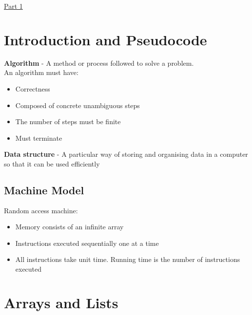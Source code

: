 \documentclass{article}[18pt]
\begin{document}
\begin{center}
\underline{\huge Part 1}
\end{center}
\section{Introduction and Pseudocode}
\textbf{Algorithm} - A method or process followed to solve a problem.\\
An algorithm must have:
\begin{itemize}
	\item Correctness
	\item Composed of concrete unambiguous steps
	\item The number of steps must be finite
	\item Must terminate
\end{itemize}
\textbf{Data structure} - A particular way of storing and organising data in a computer so that it can be used efficiently
\subsection{Machine Model}
Random access machine:
\begin{itemize}
	\item Memory consists of an infinite array
	\item Instructions executed sequentially one at a time
	\item All instructions take unit time. Running time is the number of instructions executed
\end{itemize}
\section{Arrays and Lists}
\end{document}
